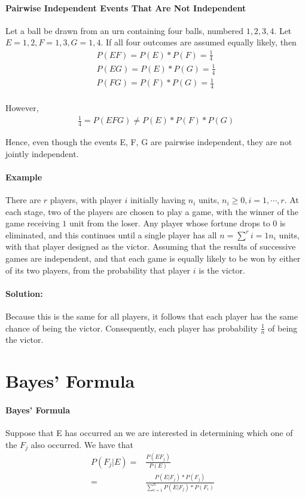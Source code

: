 \documentclass[10 pt,final]{article}
\newcommand{\impo}[1]{{\color{magenta} #1}}
\begin{document}
\paragraph{Pairwise Independent Events That Are Not Independent} Let a ball be drawn from an urn containing four balls, numbered $1,2,3,4$. Let $E = {1,2}, F={1,3}, G={1,4}$. If all four outcomes are assumed equally likely, then 
\begin{align*}
P(EF) = P(E) * P(F) = \frac{1}{4} \\
P(EG) = P(E) * P(G) = \frac{1}{4} \\
P(FG) = P(F) * P(G) = \frac{1}{4} \\
\end{align*}

However,
\begin{align*}
\frac{1}{4} = P(EFG) \neq P(E)*P(F)*P(G) 
\end{align*}

Hence, even though the events E, F, G are pairwise independent, they are \impo{not jointly independent}.


\paragraph{Example} There are $r$ players, with player $i$ initially having $n_i$ units, $n_i \ge 0, i = 1, \cdots, r$. At each stage, two of the players are chosen to play a game, with the winner of the game receiving $1$ unit from the loser. Any player whose fortune drops to $0$ is eliminated, and this continues until a single player has all $n = \sum^r{i=1} n_i$ units, with that player designed as the victor. Assuming that the results of successive games are independent, and that each game is equally likely to be won by either of its two players, from the probability that player $i$ is the victor.

\paragraph{Solution:} Because this is the same for all players, it follows that each player has the same chance of being the victor. Consequently, each player has probability $\frac{1}{n}$ of being the victor. 

\section{Bayes' Formula}
\paragraph{Bayes' Formula} Suppose that E has occurred an we are interested in determining which one of the $F_j$ also occurred. We have that
\begin{align*}
P(F_j |E) = & \frac{P(EF_j)}{P(E)} & \\
= &\frac{P(E|F_j) * P(F_j)}{\sum^n_{i=1} P(E|F_j) * P(F_i)}
\end{align*}
\end{document}
